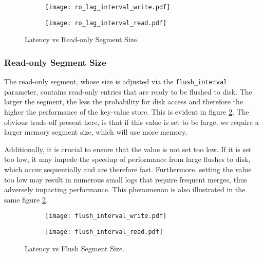 \begin{figure}[h]
    \begin{subfigure}{.5\textwidth}
        \centering
        \texttt{[image: ro\_lag\_interval\_write.pdf]}
    \end{subfigure}
    \begin{subfigure}{.5\textwidth}
        \centering
        \texttt{[image: ro\_lag\_interval\_read.pdf]}
    \end{subfigure}
    \caption{Latency vs Read-only Segment Size.}
    \label{fig:ro_lag_interval}
\end{figure}

\subsubsection{Read-only Segment Size}

The read-only segment, whose size is adjusted via the \verb"flush_interval" parameter, contains read-only entries that are ready to be flushed to disk. The larger the segment, the less the probability for disk access and therefore the higher the performance of the key-value store. This is evident in figure \ref{fig:flush_interval_write_read}. The obvious trade-off present here, is that if this value is set to be large, we require a larger memory segment size, which will use more memory.


Additionally, it is crucial to ensure that the value is not set too low. If it is set too low, it may impede the speedup of performance from large flushes to disk, which occur sequentially and are therefore fast. Furthermore, setting the value too low may result in numerous small logs that require frequent merges, thus adversely impacting performance. This phenomenon is also illustrated in the same figure \ref{fig:flush_interval_write_read}.

\begin{figure}[h]
    \begin{subfigure}{.5\textwidth}
        \centering
        \texttt{[image: flush\_interval\_write.pdf]}
    \end{subfigure}
    \begin{subfigure}{.5\textwidth}
        \centering
        \texttt{[image: flush\_interval\_read.pdf]}
    \end{subfigure}
    \caption{Latency vs Flush Segment Size.}
    \label{fig:flush_interval_write_read}
\end{figure}

